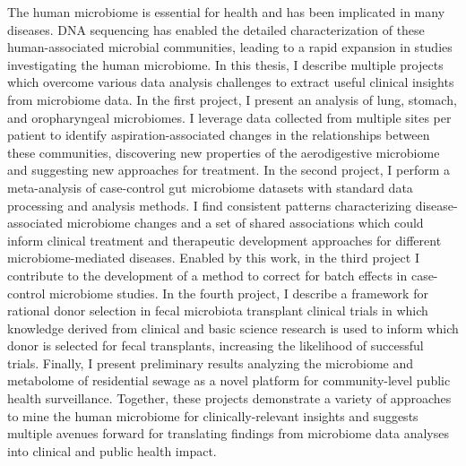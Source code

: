 
The human microbiome is essential for health and has been implicated in many diseases.
DNA sequencing has enabled the detailed characterization of these human-associated microbial communities, leading to a rapid expansion in studies investigating the human microbiome.
In this thesis, I describe multiple projects which overcome various data analysis challenges to extract useful clinical insights from microbiome data.
In the first project, I present an analysis of lung, stomach, and oropharyngeal microbiomes.
I leverage data collected from multiple sites per patient to identify aspiration-associated changes in the relationships between these communities, discovering new properties of the aerodigestive microbiome and suggesting new approaches for treatment.
In the second project, I perform a meta-analysis of case-control gut microbiome datasets with standard data processing and analysis methods.
I find consistent patterns characterizing disease-associated microbiome changes and a set of shared associations which could inform clinical treatment and therapeutic development approaches for different microbiome-mediated diseases.
Enabled by this work, in the third project I contribute to the development of a method to correct for batch effects in case-control microbiome studies.
In the fourth project, I describe a framework for rational donor selection in fecal microbiota transplant clinical trials in which knowledge derived from clinical and basic science research is used to inform which donor is selected for fecal transplants, increasing the likelihood of successful trials.
Finally, I present preliminary results analyzing the microbiome and metabolome of residential sewage as a novel platform for community-level public health surveillance.
Together, these projects demonstrate a variety of approaches to mine the human microbiome for clinically-relevant insights and suggests multiple avenues forward for translating findings from microbiome data analyses into clinical and public health impact.
